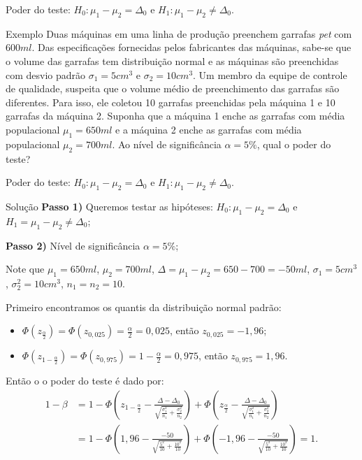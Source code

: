 \documentclass[9pt]{beamer}
\begin{document}
\begin{frame}{Poder do teste: $H_0:\mu_1 - \mu_2 = \Delta_0$ e $H_1: \mu_1 - \mu_2 \neq \Delta_0$.}

\begin{block}{Exemplo}
	Duas máquinas em uma linha de produção preenchem garrafas \textit{pet} com $600ml$. Das especificações fornecidas pelos fabricantes das máquinas, sabe-se que o volume das garrafas tem distribuição normal e as máquinas são preenchidas com desvio padrão $\sigma_1=5cm^3$ e $\sigma_2=10cm^3$. Um membro da equipe de controle de qualidade, suspeita que o volume médio de preenchimento das garrafas são diferentes. Para isso, ele coletou 10 garrafas preenchidas pela máquina 1 e 10 garrafas da máquina 2. Suponha que a máquina 1 enche as garrafas com média populacional $\mu_1=650ml$ e a máquina 2 enche as garrafas com média populacional $\mu_2=700ml$. Ao nível de significância $\alpha=5\%$, qual o poder do teste?	
\end{block}
\end{frame}

\begin{frame}{Poder do teste: $H_0:\mu_1 - \mu_2 = \Delta_0$ e $H_1: \mu_1 - \mu_2 \neq \Delta_0$.}

\footnotesize

\begin{block}{Solução}
	\textbf{Passo 1)} Queremos testar as hipóteses: $H_0: \mu_1 - \mu_2 = \Delta_0$ e $H_1= \mu_1 - \mu_2 \neq \Delta_0$;
	
	\textbf{Passo 2)} Nível de significância $\alpha=5\%$;
	
	Note que $\mu_1=650ml$, $\mu_2=700ml$, $\Delta=\mu_1-\mu_2=650-700=-50ml$, $\sigma_1=5cm^3$, $\sigma_2^2 = 10cm^3$, $n_1=n_2=10$.
	
	Primeiro encontramos os quantis da distribuição normal padrão:
	\begin{itemize}
		\item $\Phi\left(z_{\frac{\alpha}{2}}\right) = \Phi\left(z_{0,025}\right) = \frac{\alpha}{2} = 0,025$, então $z_{0,025} = -1,96$;
		\item  $\Phi\left(z_{1-\frac{\alpha}{2}}\right) = \Phi\left(z_{0,975}\right) =1- \frac{\alpha}{2} = 0,975$, então $z_{0,975} = 1,96$.
	\end{itemize}
	Então o o poder do teste é dado por:
	\begin{align*}
		1-\beta &= 1 - \Phi\left( z_{1-\frac{\alpha}{2}} - \frac{ \Delta - \Delta_0 }{ \sqrt{ \frac{\sigma_1^2}{n_1} + \frac{\sigma_2^2}{n_2} } } \right) + \Phi\left( z_{\frac{\alpha}{2}} - \frac{ \Delta - \Delta_0 }{ \sqrt{ \frac{\sigma_1^2}{n_1} + \frac{\sigma_2^2}{n_2} } } \right)\\ 
		&= 1- \Phi\left( 1,96 - \frac{-50}{\sqrt{ \frac{5^2}{10} + \frac{10^2}{10} }} \right) + \Phi\left( -1,96 - \frac{-50}{\sqrt{ \frac{5^2}{10} + \frac{10^2}{10} }} \right) = 1.
	\end{align*}
\end{block}

\normalsize
\end{frame}
\end{document}
